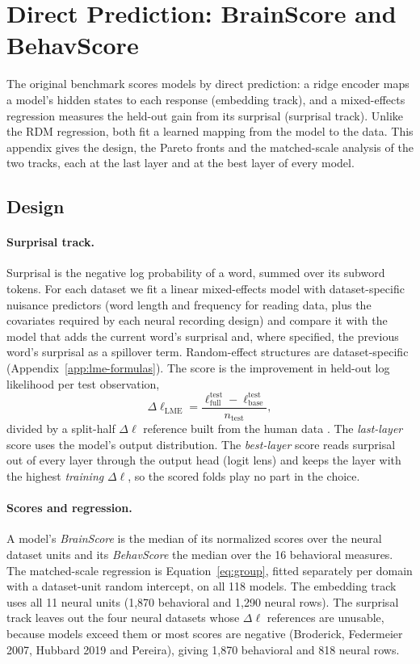 \section{Direct Prediction: BrainScore and BehavScore}
\label{app:direct}

The original benchmark scores models by direct prediction: a ridge encoder maps a model's hidden states to each response (embedding track), and a mixed-effects regression measures the held-out gain from its surprisal (surprisal track). Unlike the RDM regression, both fit a learned mapping from the model to the data. This appendix gives the design, the Pareto fronts and the matched-scale analysis of the two tracks, each at the last layer and at the best layer of every model.

\subsection{Design}
\label{sec:design-tracks}

\paragraph{Surprisal track.}
Surprisal is the negative log probability of a word, summed over its subword tokens. For each dataset we fit a linear mixed-effects model with dataset-specific nuisance predictors (word length and frequency for reading data, plus the covariates required by each neural recording design) and compare it with the model that adds the current word's surprisal and, where specified, the previous word's surprisal as a spillover term. Random-effect structures are dataset-specific (Appendix~\ref{app:lme-formulas}). The score is the improvement in held-out log likelihood per test observation,
\begin{equation}
\Delta\ell_{\mathrm{LME}}=\frac{\ell_{\mathrm{full}}^{\mathrm{test}}-\ell_{\mathrm{base}}^{\mathrm{test}}}{n_{\mathrm{test}}},
\label{eq:dll-lme}
\end{equation}
divided by a split-half $\Delta\ell$ reference built from the human data \citep{timkey2026dissociation}. The \emph{last-layer} score uses the model's output distribution. The \emph{best-layer} score reads surprisal out of every layer through the output head (logit lens) and keeps the layer with the highest \emph{training} $\Delta\ell$, so the scored folds play no part in the choice.

\paragraph{Scores and regression.}
A model's \emph{BrainScore} is the median of its normalized scores over the neural dataset units and its \emph{BehavScore} the median over the 16 behavioral measures. The matched-scale regression is Equation~\ref{eq:group}, fitted separately per domain with a dataset-unit random intercept, on all 118 models. The embedding track uses all 11 neural units (1,870 behavioral and 1,290 neural rows). The surprisal track leaves out the four neural datasets whose $\Delta\ell$ references are unusable, because models exceed them or most scores are negative (Broderick, Federmeier 2007, Hubbard 2019 and Pereira), giving 1,870 behavioral and 818 neural rows.

